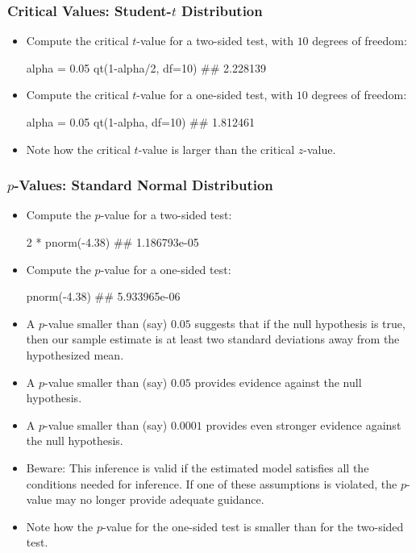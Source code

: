 \begin{frame}[fragile,shrink=10]%
\frametitle{Critical Values: Student-$t$ Distribution}
\begin{itemize}
\item Compute the critical $t$-value for a two-sided test, with $10$ degrees of freedom:
\begin{Rcode}
alpha = 0.05
qt(1-alpha/2, df=10)
## 2.228139
\end{Rcode}
\item Compute the critical $t$-value for a one-sided test, with $10$ degrees of freedom:
\begin{Rcode}
alpha = 0.05
qt(1-alpha, df=10)
## 1.812461
\end{Rcode}
\item Note how the critical $t$-value is larger than the critical $z$-value.
\end{itemize}
\end{frame}


\begin{frame}[fragile,shrink=10]%
\frametitle{$p$-Values: Standard Normal Distribution}
\begin{itemize}
\item Compute the $p$-value for a two-sided test:
\begin{Rcode}
2 * pnorm(-4.38)
## 1.186793e-05
\end{Rcode}
\item Compute the $p$-value for a one-sided test:
\begin{Rcode}
pnorm(-4.38)
## 5.933965e-06
\end{Rcode}
\item A $p$-value smaller than (say) $0.05$ suggests that if the null hypothesis is true, then our sample estimate is at least two standard deviations away from the hypothesized mean. 
\item A $p$-value smaller than (say) $0.05$ provides evidence against the null hypothesis.
\item A $p$-value smaller than (say) $0.0001$ provides even stronger evidence against the null hypothesis. 
\item Beware: This inference is valid if the estimated model satisfies all the conditions needed for inference. If one of these assumptions is violated, the $p$-value may no longer provide adequate guidance.
\item Note how the $p$-value for the one-sided test is smaller than for the two-sided test.
\end{itemize}
\end{frame}



